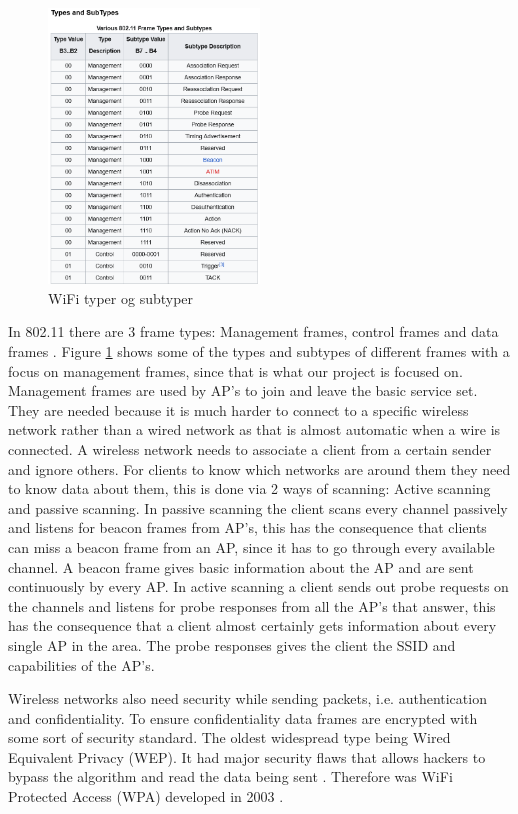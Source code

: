 \begin{figure}[!htbp]
    \centering
    \includegraphics[width=0.5\textwidth]{Latex-Files/Billeder/WIFI_Types.png}
    \caption{WiFi typer og subtyper}
    \label{Wifi Types}
\end{figure}

In 802.11 there are 3 frame types: Management frames, control frames and data frames \cite{Amit802.11frames, DefinitiveGast}. Figure \ref{Wifi Types} shows some of the types and subtypes of different frames with a focus on management frames, since that is what our project is focused on.  Management frames are used by AP's to join and leave the basic service set. They are needed because it is much harder to connect to a specific wireless network rather than a wired network as that is almost automatic when a wire is connected. A wireless network needs to associate a client from a certain sender and ignore others. For clients to know which networks are around them they need to know data about them, this is done via 2 ways of scanning: Active scanning and passive scanning. In passive scanning the client scans every channel passively and listens for beacon frames from AP's, this has the consequence that clients can miss a beacon frame from an AP, since it has to go through every available channel. A beacon frame gives basic information about the AP and are sent continuously by every AP. In active scanning a client sends out probe requests on the channels and listens for probe responses from all the AP's that answer, this has the consequence that a client almost certainly gets information about every single AP in the area. The probe responses gives the client the SSID and capabilities of the AP's. 

Wireless networks also need security while sending packets, i.e. authentication and confidentiality. To ensure confidentiality data frames are encrypted with some sort of security standard. The oldest widespread type being Wired Equivalent Privacy (WEP). It had major security flaws that allows hackers to bypass the algorithm and read the data being sent \cite{WEP1}. Therefore was WiFi Protected Access (WPA) developed in 2003 \cite{WEP3}. 


